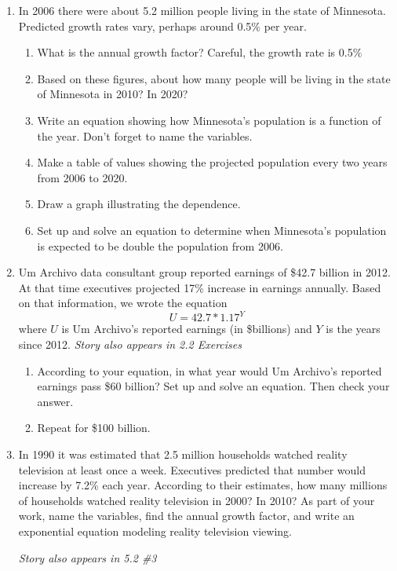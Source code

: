 \begin{enumerate}
\item In 2006 there were about 5.2 million people living in the state of Minnesota.  Predicted growth rates vary, perhaps around 0.5\% per year. %
\begin{enumerate}
\item What is the annual growth factor?  Careful, the growth rate is 0.5\%
\item Based on these figures, about how many people will be living in the state of Minnesota in 2010?  In 2020?  
\item Write an equation showing how Minnesota's population is a function of the year.  Don't forget to name the variables.
\item Make a table of values showing the projected population every two years from 2006 to 2020.  
\item Draw a graph illustrating the dependence.
\item Set up and solve an equation to determine when Minnesota's population is expected to be double the population from 2006.
\end{enumerate}

\item Um Archivo data consultant group reported earnings of \$42.7 billion in 2012.  At that time executives projected 17\% increase in earnings annually.  Based on that information, we wrote the equation $$U = 42.7 \ast 1.17^Y$$ where $U$ is Um Archivo's reported earnings (in \$billions) and $Y$ is the years since 2012.
\hfill \emph{Story also appears in 2.2 Exercises}
\begin{enumerate}
\item According to your equation, in what year would Um Archivo's reported earnings pass \$60 billion?  Set up and solve an equation.  Then check your answer.
\item Repeat for \$100 billion.
\end{enumerate}  

\item In 1990 it was estimated that 2.5 million households watched reality television at least once a week.  Executives predicted that number would increase by 7.2\% each year.  According to their estimates, how many millions of households watched reality television in 2000?  In 2010?  As part of your work, name the variables, find the annual growth factor, and write an exponential equation modeling reality television viewing.

\hfill \emph{Story also appears in 5.2 \#3}

\end{enumerate}




